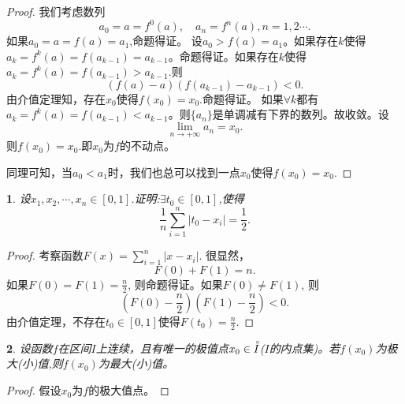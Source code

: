 \documentclass[utf8]{book}
\newtheorem{example}{}[section]             %
\begin{document}
\begin{proof}我们考虑数列
$$a_0=a=f^0(a), \quad a_n = f^n(a), n = 1,2\cdots.$$
如果$a_0 = a=f(a)=a_1$,命题得证。
设$a_0 > f(a) = a_1$。如果存在$k$使得$a_k = f^k(a) = f(a_{k-1}) = a_{k-1}$。命题得证。如果存在$k$使得$a_k = f^k(a) = f(a_{k-1}) > a_{k-1}$.则$$(f(a)-a)(f(a_{k-1})-a_{k-1}) < 0.$$由介值定理知，存在$x_0$使得$f(x_0) = x_0$.命题得证。
如果$\forall k$都有$a_k = f^k(a) = f(a_{k-1}) < a_{k-1}$。则$\{a_n\}$是单调减有下界的数列。故收敛。设$$\displaystyle\lim_{n\to +\infty}a_n = x_0.$$
则$f(x_0) = x_0$.即$x_0$为$f$的不动点。

同理可知，当$a_0 < a_1$时，我们也总可以找到一点$x_0$使得$f(x_0) = x_0$.
\end{proof}
\begin{example}
设$x_1,x_2,\cdots,x_n\in[0,1]$.证明:$\exists t_0\in [0,1]$,使得
$$\frac{1}{n}\displaystyle\sum_{i=1}^n|t_0-x_i|=\frac{1}{2}.$$
\end{example}
\begin{proof}考察函数$F(x) = \displaystyle\sum_{i=1}^n|x-x_i|$.
很显然，
$$F(0) + F(1) = n.$$
如果$F(0)=F(1) = \frac{n}{2}$, 则命题得证。如果$F(0)\neq F(1)$, 则$$\left(F(0)-\frac{n}{2}\right)\left(F(1)-\frac{n}{2}\right) < 0.$$
由介值定理，不存在$t_0\in[0,1]$使得$F(t_0) = \frac{n}{2}$.
\end{proof}
\begin{example}
设函数$f$在区间$I$上连续，且有唯一的极值点$x_0\in\accentset{\circ}{I}$($I$的内点集)。若$f(x_0)$为极大(小)值,则$f(x_0)$为最大(小)值。
\end{example}
\begin{proof}假设$x_0$为$f$的极大值点。

\end{proof}








\end{document}
